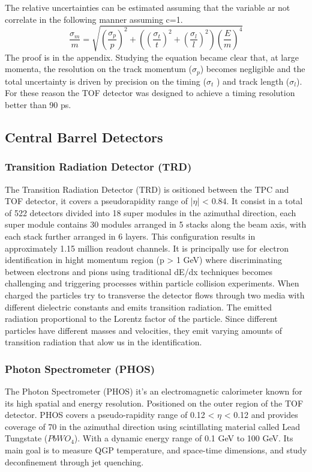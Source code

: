 \documentclass[12pt,a4paper]{book}
\begin{document}
	 The relative uncertainties can be estimated assuming that the variable ar not correlate in the following manner assuming c=1.
	 \begin{equation}
		 	\frac{\sigma_m}{m}= \sqrt{\left(\frac{\sigma_p}{p} \right)^2 + \left(\left(\frac{\sigma_t}{t} \right)^2+ \left(\frac{\sigma_l}{l} \right)^2\right) \left(\frac{E}{m}\right)^4  }
	 \end{equation}
	 The proof is in the appendix.
	 Studying the equation became clear that, at large momenta, the resolution on the track momentum ($\sigma_p$) becomes negligible and the total uncertainty is driven by precision on the timing ($\sigma_t$ ) and track length ($\sigma_l$). For these reason the TOF detector was designed to achieve a timing resolution better than 90 ps.
	 \cite{Padhan:2924203} \cite{amsdottorato9036} \cite{Cheng:2908766}
	 
	 \subsection{Central Barrel Detectors}
	 
	 \subsubsection{Transition Radiation Detector (TRD)}
	  The Transition Radiation Detector (TRD) is ositioned between the TPC and TOF detector, it covers a pseudorapidity range of |$\eta$| < 0.84. It consist in a total of 522 detectors divided into 18 super modules in the azimuthal direction, each super module contains 30 modules  arranged in 5 stacks along the beam axis, with each stack further arranged in 6 layers. This configuration results in approximately 1.15 million readout channels. It is principally use for electron identification in hight momentum region (p > 1 GeV)  where discriminating between electrons and pions using traditional dE/dx techniques becomes challenging and triggering processes within particle collision experiments. When charged the particles try to transverse the detector flows through two media with different dielectric constants and emits transition radiation. The emitted radiation proportional to the Lorentz factor of the particle. Since different particles have different masses and velocities, they emit varying amounts of transition radiation that alow us in the identification. \cite{Padhan:2924203} \cite{amsdottorato9036}
	  
	  \subsubsection{Photon Spectrometer (PHOS)}
	  The Photon Spectrometer (PHOS) it's an electromagnetic calorimeter known for its
	  high spatial and energy resolution. Positioned on the outer region of the TOF detector. PHOS covers a pseudo-rapidity range of 0.12 < $\eta$ < 0.12 and provides coverage of 70 in the azimuthal direction using scintillating material called Lead Tungstate ($PbWO_4$).  With a dynamic energy range of 0.1 GeV to 100 GeV. Its main goal is to measure QGP temperature, and space-time dimensions, and study deconfinement through jet quenching. \cite{Padhan:2924203} \cite{amsdottorato9036}
	  
\end{document}
